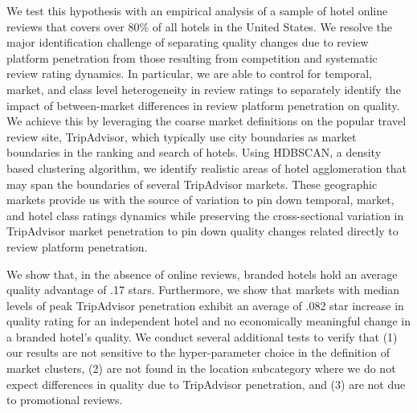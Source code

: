 \documentclass[12pt, leqno]{article}
\begin{document}
We test this hypothesis with an empirical analysis of a sample of hotel online reviews that covers over 80\% of all hotels in the United States. We resolve the major identification challenge of separating quality changes due to review platform penetration from those resulting from competition and systematic review rating dynamics. In particular, we are able to control for temporal, market, and class level heterogeneity in review ratings to separately identify the impact of between-market differences in review platform penetration on quality. We achieve this by leveraging the coarse market definitions on the popular travel review site, TripAdvisor, which typically use city boundaries as market boundaries in the ranking and search of hotels. Using HDBSCAN, a density based clustering algorithm, we identify realistic areas of hotel agglomeration that may span the boundaries of several TripAdvisor markets. These geographic markets provide us with the source of variation to pin down temporal, market, and hotel class ratings dynamics while preserving the cross-sectional variation in TripAdvisor market penetration to pin down quality changes related directly to review platform penetration. 

We show that, in the absence of online reviews, branded hotels hold an average quality advantage of .17 stars. Furthermore, we show that markets with median levels of peak TripAdvisor penetration exhibit an average of .082 star increase in quality rating for an independent hotel and no economically meaningful change in a branded hotel's quality. We conduct several additional tests to verify that (1) our results are not sensitive to the hyper-parameter choice in the definition of market clusters, (2) are not found in the location subcategory where we do not expect differences in quality due to TripAdvisor penetration, and (3) are not due to promotional reviews.
\end{document}
